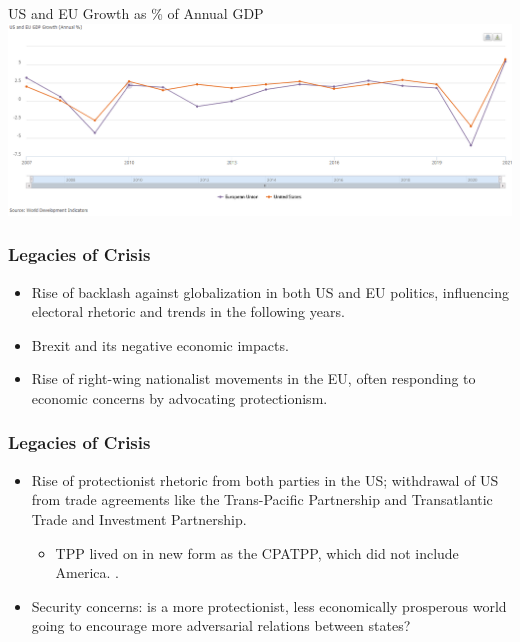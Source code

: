 \documentclass{beamer}
\begin{document}
\begin{frame}{\LARGE US and EU Growth as \% of Annual GDP}
	\centering
	\includegraphics[width=\textwidth,height=\textheight,keepaspectratio]{WDIgdp.png}
\end{frame}

\begin{frame} 
	\frametitle{\LARGE{Legacies of Crisis}}
	\begin{itemize}
		\item Rise of backlash against globalization in both US and EU politics, influencing  electoral rhetoric and trends in the following years. 
		\item Brexit and its negative economic impacts.
		\item Rise of right-wing nationalist movements in the EU, often responding to economic concerns by advocating protectionism.	
	\end{itemize}
\end{frame}

\begin{frame} 
	\frametitle{\LARGE{Legacies of Crisis}}
	\begin{itemize}
		\item Rise of protectionist rhetoric from both parties in the US; withdrawal of US from trade agreements like the Trans-Pacific Partnership and Transatlantic Trade and Investment Partnership.
		\begin{itemize}
			\item TPP lived on in new form as the CPATPP, which did not include America. \pause.
		\end{itemize}
		\item Security concerns: is a more protectionist, less economically prosperous world going to encourage more adversarial relations between states?	
	\end{itemize}
\end{frame}
\end{document}
